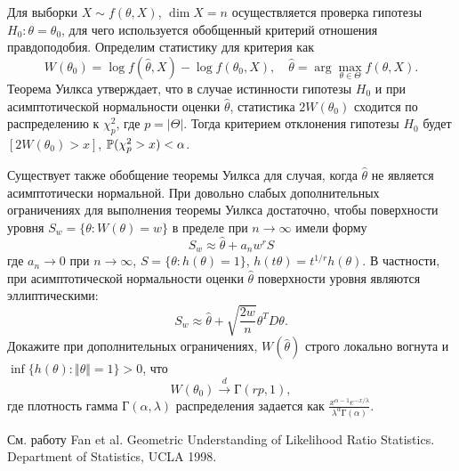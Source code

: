 \begin{problem}
Для выборки $X \sim f(\theta, X)$, $\dim X = n$ осуществляется проверка гипотезы $H_0: \theta = \theta_0$, для чего используется обобщенный критерий отношения правдоподобия. 
Определим статистику для критерия как 
\[
W(\theta_0) = \log f(\widehat{\theta}, X) - \log f(\theta_0, X),
\quad  \widehat{\theta} = \arg\max_{\theta \in \Theta} f(\theta, X).
\] 
Теорема Уилкса утверждает, что в случае истинности гипотезы  $H_0$ и при асимптотической нормальности оценки $\widehat{\theta}$, статистика  
$2W(\theta_0)$ сходится по распределению к $\chi_{p}^2$, где $p = |\Theta|$. 
Тогда критерием отклонения гипотезы $H_0$ будет $[2W(\theta_0) > x]$, $\mathrm{{\mathbb P}}(\chi_{p}^2 > x) < \alpha$. 

Существует также обобщение теоремы Уилкса для случая, когда $\widehat{\theta}$ не является асимптотически нормальной. При довольно слабых дополнительных ограничениях для выполнения теоремы Уилкса достаточно, чтобы поверхности уровня  $S_w = \{\theta: W(\theta) = w\}$ в пределе при $n \to \infty$ имели форму
\[
S_w  \approx \widehat{\theta} + a_n w^r S
\]  
где $a_n \to 0 $ при $n \to \infty$, $S = \{\theta: h(\theta) = 1 \}$, $h(t\theta) = t^{1/r} h(\theta)$. В частности, при асимптотической нормальности оценки $\widehat{\theta}$ поверхности уровня являются эллиптическими:
\[
S_w  \approx \widehat{\theta} +  \sqrt{\frac{2w}{n}} \theta^T D \theta.
\]
Докажите при дополнительных ограничениях, $W(\widehat{\theta})$ строго локально вогнута и $\inf\{h(\theta): \Vert \theta \Vert = 1\} > 0$, что 
\[
W(\theta_0) \overset{d}{\longrightarrow} \text{Г}(rp, 1),
\]
где плотность гамма $\text{Г}(\alpha, \lambda)$ распределения задается как $\frac{x^{\alpha-1} e^{-x/\lambda}}{\lambda^\alpha\text{Г}(\alpha)}$.

\end{problem}

\begin{ordre}
См. работу Fan et al. Geometric Understanding of Likelihood Ratio Statistics. Department of Statistics, UCLA 1998.
\end{ordre}
